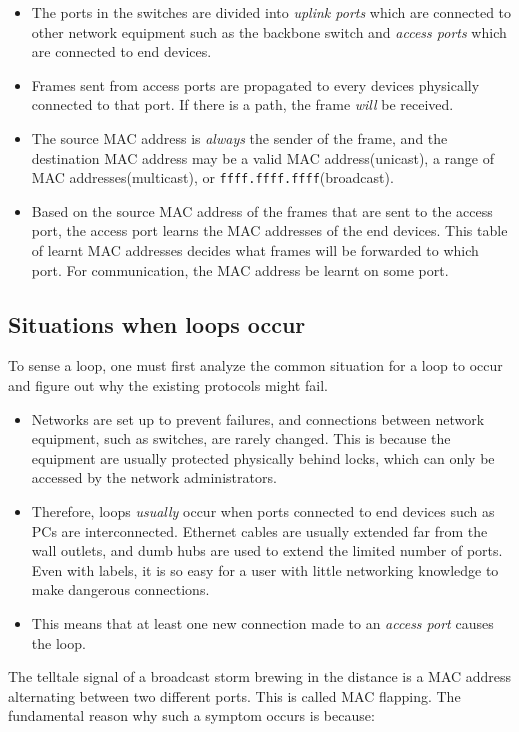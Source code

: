 \documentclass{article}
\begin{document}
\begin{itemize}
    \item The ports in the switches are divided into \textit{uplink ports} which are connected to other network equipment such as the backbone switch and \textit{access ports} which are connected to end devices.
    \item Frames sent from access ports are propagated to every devices physically connected to that port. If there is a path, the frame \textit{will} be received.
    \item The source MAC address is \textit{always} the sender of the frame, and the destination MAC address may be a valid MAC address(unicast), a range of MAC addresses(multicast), or \texttt{ffff.ffff.ffff}(broadcast).
    \item Based on the source MAC address of the frames that are sent to the access port, the access port learns the MAC addresses of the end devices. This table of learnt MAC addresses decides what frames will be forwarded to which port. For communication, the MAC address  be learnt on some port.
\end{itemize}

\subsection{Situations when loops occur}

To sense a loop, one must first analyze the common situation for a loop to occur and figure out why the existing protocols might fail.
\begin{itemize}
    \item Networks are set up to prevent failures, and connections between network equipment, such as switches, are rarely changed. This is because the equipment are usually protected physically behind locks, which can only be accessed by the network administrators.
    \item Therefore, loops \textit{usually} occur when ports connected to end devices such as PCs are interconnected. Ethernet cables are usually extended far from the wall outlets, and dumb hubs are used to extend the limited number of ports. Even with labels, it is so easy for a user with little networking knowledge to make dangerous connections.
    \item This means that at least one new connection made to an \textit{access port} causes the loop.
\end{itemize}

The telltale signal of a broadcast storm brewing in the distance is a MAC address alternating between two different ports. This is called MAC flapping. The fundamental reason why such a symptom occurs is because:
\end{document}

